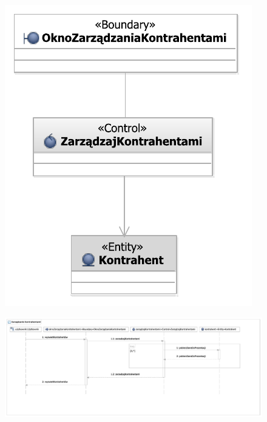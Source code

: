 \begin{figure}[H]
  \centering
  \includegraphics[angle=\ecbangle, scale=\ecbscale]{../img/usecase/pu8ecb.pdf}
  \caption{}
\end{figure}
\newpage %
\begin{figure}[H]
  \centering
  \includegraphics[angle=\seqangle, scale=0.45]{../img/usecase/pu8seq.pdf}
  \caption{}
\end{figure}
\newpage

